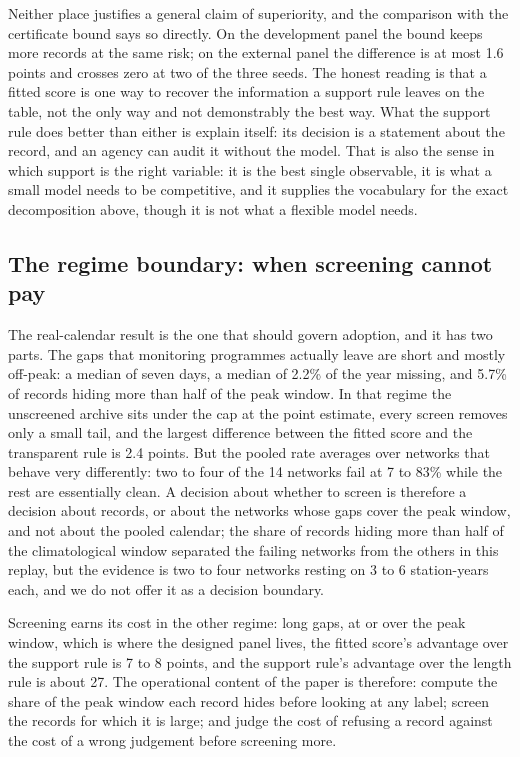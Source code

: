 \documentclass[draft]{agujournal2025}
\begin{document}
Neither place justifies a general claim of superiority, and the comparison with
the certificate bound says so directly. On the development panel the bound keeps
more records at the same risk; on the external panel the difference is at most
1.6 points and crosses zero at two of the three seeds. The honest reading is that a
fitted score is one way to recover the information a support rule leaves on the
table, not the only way and not demonstrably the best way. What the support rule
does better than either is explain itself: its decision is a statement about the
record, and an agency can audit it without the model. That is also the sense in
which support is the right variable: it is the best single observable, it is what
a small model needs to be competitive, and it supplies the vocabulary for the
exact decomposition above, though it is not what a flexible model needs.

\subsection{The regime boundary: when screening cannot pay}

The real-calendar result is the one that should govern adoption, and it has two
parts. The gaps that monitoring programmes actually leave are short and mostly
off-peak: a median of seven days, a median of 2.2\% of the year missing, and 5.7\%
of records hiding more than half of the peak window. In that regime the unscreened
archive sits under the cap at the point estimate, every screen removes only a
small tail, and the largest difference between the fitted score and the
transparent rule is 2.4 points. But the pooled rate averages over networks that
behave very differently: two to four of the 14 networks fail at 7 to 83\% while the
rest are essentially clean. A decision about whether to screen is therefore a
decision about records, or about the networks whose gaps cover the peak window,
and not about the pooled calendar; the share of records hiding more than half
of the climatological window separated the failing networks from the others in
this replay, but the evidence is two to four networks resting on 3 to 6
station-years each, and we do not offer it as a decision boundary.

Screening earns its cost in the other regime: long gaps, at or over the peak
window, which is where the designed panel lives, the fitted score's advantage
over the support rule is 7 to 8 points, and the support rule's advantage over
the length rule is about 27. The operational content of the paper is
therefore: compute the share of the peak window each record hides before looking
at any label; screen the records for which it is large; and judge the cost of
refusing a record against the cost of a wrong judgement before screening more.
\end{document}
